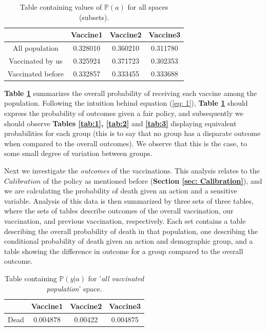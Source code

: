 \documentclass{article}
\begin{document}
\begin{center}
    \begin{table}[H]
    \centering
        \begin{tabular}{ |c| c c c|}
            \hline
            & Vaccine1 &  Vaccine2 & Vaccine3  \\
            \hline
            All population &  0.328010 &  0.360210 &  0.311780 \\
            Vaccinated by us  &  0.325924 &  0.371723 &  0.302353 \\
            Vaccinated before &  0.332857 &  0.333455 &  0.333688
            \\ \hline
        \end{tabular}
    \caption{Table containing values of $\mathbb{P}(a)$ for all spaces (subsets).}
    \label{tab:Pa_summary}
    \end{table}    
\end{center}

\textbf{Table \ref{tab:Pa_summary}} summarizes the overall probability of receiving each vaccine among the population. Following the intuition behind equation (\ref{eq: 1}), \textbf{Table \ref{tab:Pa_summary}} should express the probability of outcomes given a fair policy, and subsequently we should observe \textbf{Tables \ref{tab:1}, \ref{tab:2}} and \textbf{\ref{tab:3}} displaying equivalent probabilities for each group (this is to say that no group has a disparate outcome when compared to the overall outcomes). We observe that this is the case, to some small degree of variation between groups.

Next we investigate the \textit{outcomes} of the vaccinations. This analysis relates to the $Calibration$ of the policy as mentioned before (\textbf{Section \ref{sec: Calibration}}), and we are calculating the probability of death given an action and a sensitive variable. Analysis of this data is then summarized by three sets of three tables, where the sets of tables describe outcomes of the overall vaccination, our vaccination, and previous vaccination, respectively. Each set contains a table describing the overall probability of death in that population, one describing the conditional probability of death given an action and demographic group, and a table showing the difference in outcome for a group compared to the overall outcome.

\begin{center}
    \begin{table}[H]
    \centering
        \begin{tabular}{ |c| c c c|}
            \hline
            & Vaccine1 &  Vaccine2 & Vaccine3  \\
            \hline
            Dead &  0.004878 &   0.00422 &  0.004875 
            \\ \hline
        \end{tabular}
    \caption{Table containing $\mathbb{P}(y | a)$ for '\textit{all vaccinated population}' space.}
    \label{tab:simple_prob_py_a}
    \end{table}
\end{center}
\end{document}
